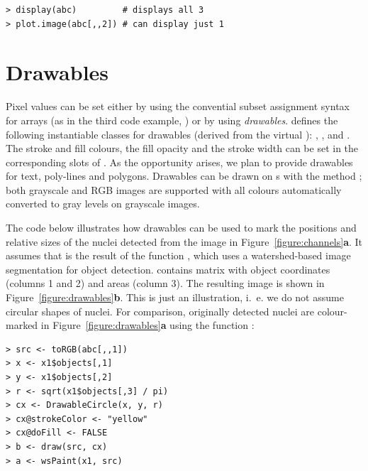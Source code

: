 \begin{verbatim}
> display(abc)         # displays all 3
> plot.image(abc[,,2]) # can display just 1
\end{verbatim}

\section*{Drawables}

Pixel values can be set either by using the convential subset assignment syntax for arrays (as in the third code example, ) or by using {\em drawables}.  defines the following instantiable classes for drawables (derived from the virtual ): , ,  and . The stroke and fill colours, the fill opacity and the stroke width can be set in the corresponding slots of . As the opportunity arises, we plan to provide drawables for text, poly-lines and polygons. Drawables can be drawn on s with the method ; both grayscale and RGB images are supported with all colours automatically converted to gray levels on grayscale images.

The code below illustrates how drawables can be used to mark the positions and relative sizes of the nuclei detected from the image in Figure~\ref{figure:channels}{\bf a}. It assumes that  is the result of the  function , which uses a watershed-based image segmentation for object detection.  contains matrix  with object coordinates (columns 1 and 2) and areas (column 3). The resulting image is shown in Figure~\ref{figure:drawables}{\bf b}. This is just an illustration, i.~e. we do not assume circular shapes of nuclei. For comparison, originally detected nuclei are colour-marked in Figure~\ref{figure:drawables}{\bf a} using the  function :
%
\begin{verbatim}
> src <- toRGB(abc[,,1])
> x <- x1$objects[,1]
> y <- x1$objects[,2]
> r <- sqrt(x1$objects[,3] / pi)
> cx <- DrawableCircle(x, y, r)
> cx@strokeColor <- "yellow"
> cx@doFill <- FALSE
> b <- draw(src, cx)
> a <- wsPaint(x1, src)
\end{verbatim} 


